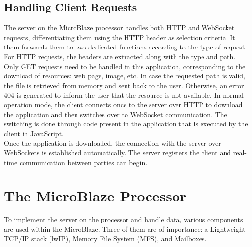     \subsection{Handling Client Requests}

      The server on the MicroBlaze processor handles both HTTP and WebSocket requests, differentiating them using the HTTP header as selection criteria. It them forwards them to two dedicated functions according to the type of request. \\

      For HTTP requests, the headers are extracted along with the type and path. Only GET requests need to be handled in this application, corresponding to the download of resources: web page, image, etc. In case the requested path is valid, the file is retrieved from memory and sent back to the user. Otherwise, an error 404 is generated to inform the user that the resource is not available. In normal operation mode, the client connects once to the server over HTTP to download the application and then switches over to WebSocket communication. The switching is done through code present in the application that is executed by the client in JavaScript. \\

      Once the application is downloaded, the connection with the server over WebSockets is established automatically. The server registers the client and real-time communication between parties can begin.

  \section{The MicroBlaze Processor}

    To implement the server on the processor and handle data, various components are used within the MicroBlaze. Three of them are of importance: a Lightweight TCP/IP stack (lwIP), Memory File System (MFS), and Mailboxes.

